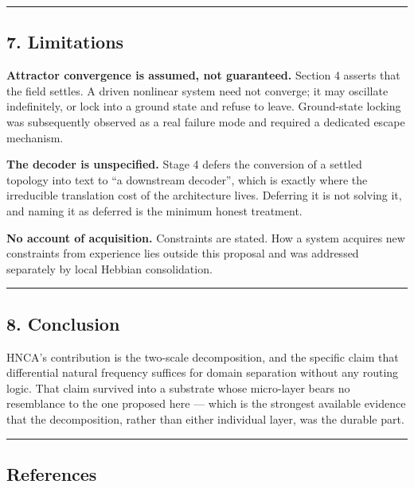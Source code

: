\documentclass[
  11pt,
  a4paper,
]{article}
\begin{document}
\begin{center}\rule{0.5\linewidth}{0.5pt}\end{center}

\subsection{7. Limitations}\label{limitations}

\textbf{Attractor convergence is assumed, not guaranteed.} Section 4
asserts that the field settles. A driven nonlinear system need not
converge; it may oscillate indefinitely, or lock into a ground state and
refuse to leave. Ground-state locking was subsequently observed as a
real failure mode and required a dedicated escape mechanism.

\textbf{The decoder is unspecified.} Stage 4 defers the conversion of a
settled topology into text to ``a downstream decoder'', which is exactly
where the irreducible translation cost of the architecture lives.
Deferring it is not solving it, and naming it as deferred is the minimum
honest treatment.

\textbf{No account of acquisition.} Constraints are stated. How a system
acquires new constraints from experience lies outside this proposal and
was addressed separately by local Hebbian consolidation.

\begin{center}\rule{0.5\linewidth}{0.5pt}\end{center}

\subsection{8. Conclusion}\label{conclusion}

HNCA's contribution is the two-scale decomposition, and the specific
claim that differential natural frequency suffices for domain separation
without any routing logic. That claim survived into a substrate whose
micro-layer bears no resemblance to the one proposed here --- which is
the strongest available evidence that the decomposition, rather than
either individual layer, was the durable part.

\begin{center}\rule{0.5\linewidth}{0.5pt}\end{center}

\subsection{References}\label{references}
\end{document}
